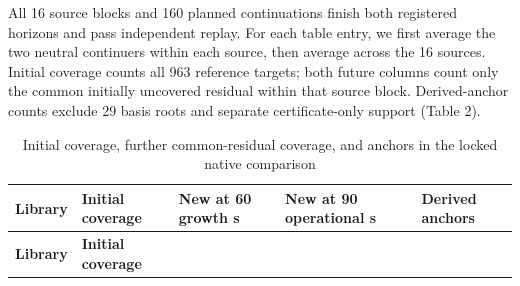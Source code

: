 \documentclass[pdflatex,sn-basic,Numbered]{sn-jnl}
\begin{document}
All 16 source blocks and 160 planned continuations finish both registered horizons and pass independent replay. For each table entry, we first average the two neutral continuers within each source, then average across the 16 sources. Initial coverage counts all 963 reference targets; both future columns count only the common initially uncovered residual within that source block. Derived-anchor counts exclude 29 basis roots and separate certificate-only support (Table 2).

\begingroup
\small
\setlength{\tabcolsep}{3pt}
\renewcommand{\arraystretch}{1.13}

\begin{longtable}[]{@{}
  >{\raggedright\arraybackslash}p{}
  >{\raggedleft\arraybackslash}p{}
  >{\raggedleft\arraybackslash}p{}
  >{\raggedleft\arraybackslash}p{}
  >{\raggedleft\arraybackslash}p{}@{}}
\caption{Initial coverage, further common-residual coverage, and anchors in the locked native comparison}\label{tab:5}\tabularnewline
\toprule\noalign{}
\begin{minipage}[b]{\linewidth}\raggedright
\textbf{Library}
\end{minipage} & \begin{minipage}[b]{\linewidth}\raggedleft
\textbf{Initial coverage}
\end{minipage} & \begin{minipage}[b]{\linewidth}\raggedleft
\textbf{New at 60 growth s}
\end{minipage} & \begin{minipage}[b]{\linewidth}\raggedleft
\textbf{New at 90 operational s}
\end{minipage} & \begin{minipage}[b]{\linewidth}\raggedleft
\textbf{Derived anchors}
\end{minipage} \\
\midrule\noalign{}
\endfirsthead
\toprule\noalign{}
\begin{minipage}[b]{\linewidth}\raggedright
\textbf{Library}
\end{minipage} & \begin{minipage}[b]{\linewidth}\raggedleft
\textbf{Initial coverage}
\end{minipage} & \begin{minipage}[b]{\linewidth}\raggedleft

\end{minipage}
\end{longtable}
\end{document}
